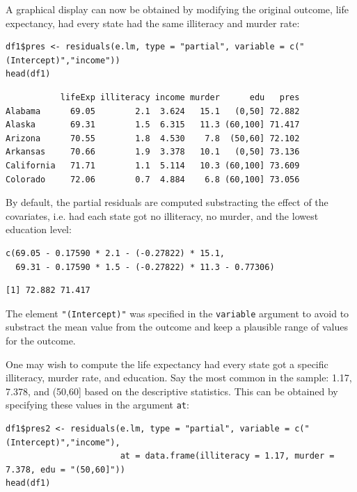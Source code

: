 \documentclass[12pt]{article}
\begin{document}
A graphical display can now be obtained by modifying the original
outcome, life expectancy, had every state had the same illiteracy and
murder rate:
\lstset{language=r,label= ,caption= ,captionpos=b,numbers=none}
\begin{lstlisting}
df1$pres <- residuals(e.lm, type = "partial", variable = c("(Intercept)","income"))
head(df1)
\end{lstlisting}

\begin{verbatim}
           lifeExp illiteracy income murder      edu   pres
Alabama      69.05        2.1  3.624   15.1   (0,50] 72.882
Alaska       69.31        1.5  6.315   11.3 (60,100] 71.417
Arizona      70.55        1.8  4.530    7.8  (50,60] 72.102
Arkansas     70.66        1.9  3.378   10.1   (0,50] 73.136
California   71.71        1.1  5.114   10.3 (60,100] 73.609
Colorado     72.06        0.7  4.884    6.8 (60,100] 73.056
\end{verbatim}


By default, the partial residuals are computed substracting the effect
of the covariates, i.e. had each state got no illiteracy, no murder,
and the lowest education level:
\lstset{language=r,label= ,caption= ,captionpos=b,numbers=none}
\begin{lstlisting}
c(69.05 - 0.17590 * 2.1 - (-0.27822) * 15.1,
  69.31 - 0.17590 * 1.5 - (-0.27822) * 11.3 - 0.77306)
\end{lstlisting}

\begin{verbatim}
[1] 72.882 71.417
\end{verbatim}


The element \texttt{"(Intercept)"} was specified in the \texttt{variable} argument
to avoid to substract the mean value from the outcome and keep a
plausible range of values for the outcome.

\bigskip

One may wish to compute the life expectancy had every state got a
specific illiteracy, murder rate, and education. Say the most common
in the sample: 1.17, 7.378, and (50,60] based on the descriptive
statistics. This can be obtained by specifying these values in the
argument \texttt{at}:
\lstset{language=r,label= ,caption= ,captionpos=b,numbers=none}
\begin{lstlisting}
df1$pres2 <- residuals(e.lm, type = "partial", variable = c("(Intercept)","income"),
                       at = data.frame(illiteracy = 1.17, murder = 7.378, edu = "(50,60]"))
head(df1)
\end{lstlisting}
\end{document}
